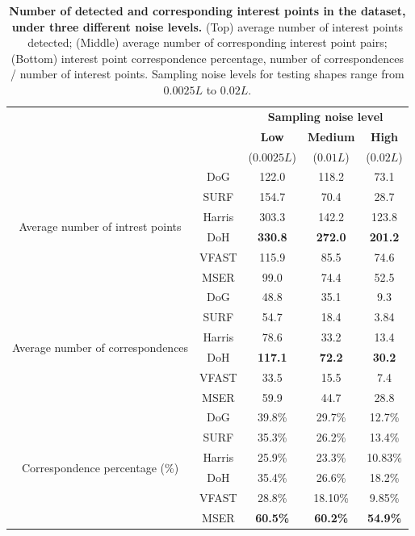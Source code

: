 \begin{table}[ht]
	\centering
	\begin{tabular}{|c|c|ccc|}
\hline
\multicolumn{2}{|c|}{} & \multicolumn{3}{c|}{\textbf{Sampling noise level}} \\
\multicolumn{2}{|c|}{} &  {\textbf{Low}}  & {\textbf{Medium}}  & {\textbf{High}}  \\
\multicolumn{2}{|c|}{} & ($0.0025L$) & ($0.01L$) & ($0.02L$) \\
\hline
\hline
\multirow{6}{*}{Average number of intrest points} 
& DoG &   122.0 & 118.2 & 73.1 \\ \cline{2-5}
& SURF & 154.7 & 70.4  & 28.7 \\ \cline{2-5}
& Harris & 303.3 & 142.2 &  123.8 \\ \cline{2-5}
& DoH &  {\textbf{\color{blue}330.8}} & {\textbf{\color{blue}272.0}} &   {\textbf{\color{blue}201.2}} \\ \cline{2-5}
& VFAST &  115.9 &  85.5  &  74.6\\  \cline{2-5}
& MSER &  99.0  & 74.4  &   52.5 \\ \hline \hline
\multirow{6}{*}{Average number of correspondences}
& DoG &  48.8 & 35.1 &  9.3 \\ \cline{2-5}
& SURF &  54.7 & 18.4  & 3.84 \\ \cline{2-5}
& Harris & 78.6  & 33.2  &    13.4  \\  \cline{2-5}
& DoH & {\textbf{\color{blue}117.1}} & {\textbf{\color{blue}72.2}}  &   {\textbf{\color{blue}30.2}} \\ \cline{2-5}
& VFAST & 33.5  & 15.5  &    7.4 \\ \cline{2-5}
& MSER & 59.9 & 44.7  &   28.8 \\ \hline \hline
\multirow{6}{*}{Correspondence percentage (\%)}
& DoG & {39.8\%} & {29.7\%} & {12.7\%} \\ \cline{2-5}
& SURF &  {35.3\%} & {26.2\%}  & {13.4\%} \\ \cline{2-5}
& Harris & {25.9\%} & {23.3\%} & {10.83\%} \\ \cline{2-5}
& DoH & {35.4\%} & {26.6\%} & {18.2\%} \\ \cline{2-5}
& VFAST & {28.8\%} & {18.10\%}  & {9.85\%} \\ \cline{2-5}
& MSER & {\textbf{\color{blue}60.5\%}}  & {\textbf{\color{blue}60.2\%}}  & {\textbf{\color{blue}54.9\%}}\\ 
\hline
\end{tabular}
\caption{\textbf{Number of detected and corresponding interest points in the \meshset dataset, under three different noise levels.} (Top) average number of interest points detected; (Middle) average number of corresponding interest point pairs; (Bottom) interest point correspondence percentage, \ie number of correspondences / number of interest points. Sampling noise levels for testing shapes range from $0.0025L$ to $0.02L$.}
\label{tab/eval/numcorr}
\end{table}


